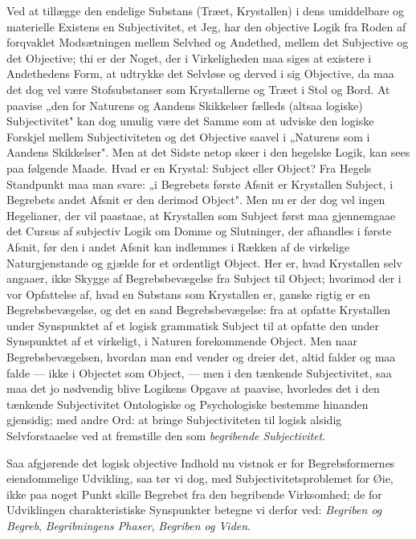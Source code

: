 \documentclass[12pt]{book}
\newcommand{\opage}[1]{\marginnote{\footnotesize\textit{[#1]}}}
\begin{document}
Ved at tillægge den endelige Substans (Træet, Krystallen) i dens umiddelbare og materielle
Existens en Subjectivitet, et Jeg, har den objective Logik fra Roden af forqvaklet
Modsætningen mellem Selvhed og Andethed, mellem det Subjective og det Objective; thi er der
Noget, der i Virkeligheden maa siges at existere i Andethedens Form, at udtrykke det
Selvløse og derved i sig Objective, da maa det dog vel være Stofsubstanser som
Krystallerne og Træet i Stol og Bord. At paavise „den for Naturens og Aandens Skikkelser
fælleds (altsaa logiske) Subjectivitet" kan dog umulig være det Samme som at udviske den
logiske Forskjel mellem Subjectiviteten og det Objective saavel i „Naturens som i Aandens
Skikkelser". Men at det Sidste netop skeer i den hegelske Logik, kan sees paa følgende
Maade. Hvad er en Krystal: Subject eller Object? Fra Hegels Standpunkt maa man svare: „i
Begrebets første Afsnit er Krystallen Subject, i Begrebets andet Afsnit er den derimod
Object". Men nu er der dog vel ingen Hegelianer, der vil paastaae, at Krystallen som
Subject først maa gjennemgaae det Cursus af subjectiv Logik om Domme og Slutninger, der
afhandles i første Afsnit, før den i andet Afsnit kan indlemmes i Rækken af de virkelige
Naturgjenstande og gjælde for et ordentligt Object. Her er, hvad Krystallen selv angaaer,
ikke Skygge af Begrebsbevægelse fra Subject til Object; hvorimod der i vor Opfattelse af,
hvad en Substans som Krystallen er, ganske rigtig er en Begrebsbevægelse, og det en sand
Begrebsbevægelse: fra at opfatte Krystallen under Synspunktet af et logisk grammatisk
Subject til at opfatte den under Synspunktet af et virkeligt, i Naturen forekommende
Object. Men naar Begrebsbevægelsen, hvordan man end vender og dreier det, altid falder og
\opage{143} maa falde --- ikke i Objectet som Object, --- men i den tænkende Subjectivitet, saa maa
det jo nødvendig blive Logikens Opgave at paavise, hvorledes det i den tænkende
Subjectivitet Ontologiske og Psychologiske bestemme hinanden gjensidig; med andre Ord: at
bringe Subjectiviteten til logisk alsidig Selvforstaaelse ved at fremstille den som
\emph{begribende Subjectivitet}.

Saa afgjørende det logisk objective Indhold nu vistnok er for Begrebsformernes
eiendommelige Udvikling, saa tør vi dog, med Subjectivitetsproblemet for Øie, ikke paa
noget Punkt skille Begrebet fra den begribende Virksomhed; de for Udviklingen
charakteristiske Synspunkter betegne vi derfor ved: \emph{Begriben og Begreb},
\emph{Begribningens Phaser}, \emph{Begriben og Viden}.
\end{document}
